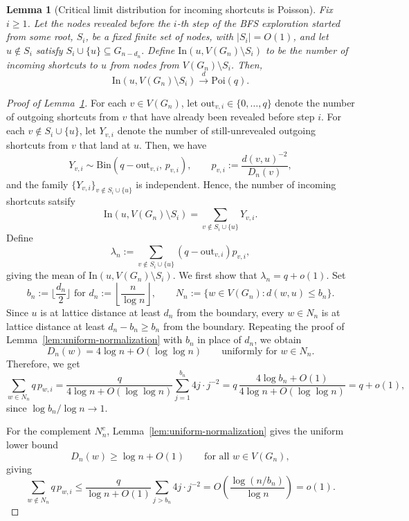 \documentclass[10pt,a4paper]{amsart}
\newtheorem{lemma}{Lemma}
\begin{document}
\begin{lemma}[Critical limit distribution for incoming shortcuts is Poisson]\label{lem:critical-poisson-input}
Fix \(i\ge 1\). Let the nodes revealed before the \(i\)-th step of the BFS exploration started from some root, \(S_i\), be a fixed finite set of nodes,
with \(|S_i|=O(1)\), and let \(u\notin S_i\) satisfy
\(
S_i\cup\{u\}\subseteq G_{n-d_n}.
\) Define
\(
\mathrm{In}(u,V(G_n)\setminus S_i)
\)
to be the number of incoming shortcuts to \(u\) from nodes from \(V(G_n)\setminus S_i\). Then, 
\[
\mathrm{In}(u,V(G_n)\setminus S_i)\xrightarrow{d}\mathrm{Poi}(q).
\]
\end{lemma}

\begin{proof}[Proof of Lemma~\ref{lem:critical-poisson-input}]
For each \(v\in V(G_n)\), let \(\mathrm{out}_{v,i}\in\{0,\dots,q\}\) denote the
number of outgoing shortcuts from \(v\) that have already been revealed before
step \(i\). For each \(v\notin S_i\cup\{u\}\), let \(Y_{v,i}\) denote the number
of still-unrevealed outgoing shortcuts from \(v\) that land at \(u\). Then, we have
\[
Y_{v,i}\sim \mathrm{Bin}\!\left(q-\mathrm{out}_{v,i},\,p_{v,i}\right),
\qquad
p_{v,i}:=\frac{d(v,u)^{-2}}{D_n(v)},
\]
and the family \(\{Y_{v,i}\}_{v\notin S_i\cup\{u\}}\) is independent. Hence, the number of incoming shortcuts satsify
\[
\mathrm{In}(u,V(G_n)\setminus S_i)
=\sum_{v\notin S_i\cup\{u\}} Y_{v,i}.
\]
Define
\[
\lambda_n:=\sum_{v\notin S_i\cup\{u\}} (q-\mathrm{out}_{v,i})p_{v,i},
\]
giving the mean of \(\mathrm{In}(u,V(G_n)\setminus S_i)\). We
first show that \(\lambda_n=q+o(1)\).
Set
\[
b_n:=\Big\lfloor \frac{d_n}{2}\Big\rfloor \text{ for } 
d_n:=\left\lfloor \frac{n}{\log n}\right\rfloor,
\qquad
N_n:=\{w\in V(G_n): d(w,u)\le b_n\}.
\]
Since \(u\) is at lattice distance at least \(d_n\) from the boundary, every
\(w\in N_n\) is at lattice distance at least \(d_n-b_n\ge b_n\) from the
boundary. Repeating the proof of Lemma~\ref{lem:uniform-normalization} with
\(b_n\) in place of \(d_n\), we obtain
\[
D_n(w)=4\log n+O(\log\log n)
\qquad\text{uniformly for }w\in N_n.
\]
Therefore, we get
\[
\sum_{w\in N_n} q\,p_{w,i}
=\frac{q}{4\log n+O(\log\log n)}\sum_{j=1}^{b_n}4j\cdot j^{-2}
=q\,\frac{4\log b_n+O(1)}{4\log n+O(\log\log n)}
=q+o(1),
\]
since \(\log b_n/\log n\to 1\).

For the complement \(N_n^c\), Lemma~\ref{lem:uniform-normalization} gives the
uniform lower bound
\[
D_n(w)\ge \log n+O(1)
\qquad\text{for all }w\in V(G_n),
\]
giving
\[
\sum_{w\notin N_n} q\,p_{w,i}
\le \frac{q}{\log n+O(1)}\sum_{j>b_n}4j\cdot j^{-2}
=O\!\left(\frac{\log(n/b_n)}{\log n}\right)
=o(1).
\]


\end{proof}
\end{document}
